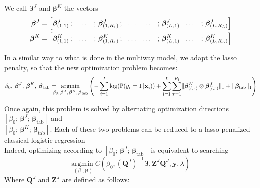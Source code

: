 \documentclass[preprint,12pt]{elsarticle}
\begin{document}
\noindent We call $\bm{\beta}^J$ and $\bm{\beta}^K$ the vectors
\begin{align}
    \bm{\beta}^J & = \left[ \bm{\beta}_{(1,1)}^J\, ; \hspace{7 pt} \hdots \hspace{7 pt} \, ; \, \bm{\beta}_{(1,R_1)}^J \,;    \hspace{7 pt} \hdots \hspace{7 pt}  \hdots \hspace{7 pt} \, ; \,  \bm{\beta}_{(L,1)}^J   \hspace{7 pt} \hdots \hspace{7 pt}  \, ;\,\bm{\beta}_{(L,R_L)}^J   \right] \\
    \bm{\beta}^K & = \left[ \bm{\beta}_{(1,1)}^K\, ; \hspace{7 pt} \hdots \hspace{7 pt} \, ; \, \bm{\beta}_{(1,R_1)}^K \,;    \hspace{7 pt} \hdots \hspace{7 pt}  \hdots \hspace{7 pt} \, ; \,  \bm{\beta}_{(L,1)}^K   \hspace{7 pt} \hdots \hspace{7 pt}  \, ;\,\bm{\beta}_{(L,R_L)}^K   \right]
\end{align}

\noindent In a similar way to what is done in the multiway model, we adapt the lasso penalty, so that the new optimization problem becomes:
\begin{equation}
    \beta_0 ,\, \bm{\beta}^J, \, \bm{\beta}^K, \, \bm{\beta}_{\text{tab}} = \hspace{- 8 pt} \underset{\beta_0 ,\, \bm{\beta}^J, \, \bm{\beta}^K, \, \bm{\beta}_{\text{tab}}}{\text{argmin}} \left(  - \sum\limits_{i = 1}^{I} \log(\mathbb{P}(y_i = 1 \, | \mathbf{x}_i)) + \sum\limits_{l = 1}^L \sum\limits_{r = 1}^{R_l}
    \lVert \bm{\beta}_{(l,r)}^K \otimes \bm{\beta}_{(l,r)}^J \rVert_1 + \lVert \bm{\beta}_{\text{tab}} \rVert_1 \right)
\end{equation}

\noindent Once again, this problem is solved by alternating optimization directions $\left[ \beta_0 ;\, \bm{\beta}^J ;\,  \bm{\beta}_{\text{tab}} \right]$ and\\
$\left[ \beta_0 ;\, \bm{\beta}^K ;\,  \bm{\beta}_{\text{tab}} \right]$. Each of these two problems can be reduced to a lasso-penalized classical logistic regression\\[3 pt]
Indeed, optimizing according to $\left[ \beta_0 ;\, \bm{\beta}^J ;\,  \bm{\beta}_{\text{tab}} \right]$ is equivalent to searching
\begin{equation}
    \underset{(\beta_0, \bm{\beta}) }{\text{argmin} \;}  C(\beta_0, (\mathbf{Q}^J)^{-1}\bm{\beta},\mathbf{Z}^J \mathbf{Q}^J, \mathbf{y}, \lambda)
\end{equation}
Where $\mathbf{Q}^J$ and $\mathbf{Z}^J$ are defined as follows:
\end{document}
